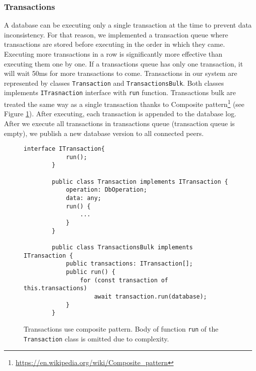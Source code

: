 \subsubsection{Transactions}
A database can be executing only a single transaction at the time to prevent data inconsistency. For that reason, we implemented a transaction queue where transactions are stored before executing in the order in which they came. Executing more transactions in a row is significantly more effective than executing them one by one. If a transactions queue has only one transaction, it will wait 50ms for more transactions to come. Transactions in our system are represented by classes \texttt{Transaction} and \texttt{TransactionsBulk}. Both classes implements \texttt{ITrasnaction} interface with \texttt{run} function. Transactions bulk are treated the same way as a single transaction thanks to Composite pattern\footnote{\url{https://en.wikipedia.org/wiki/Composite_pattern}} (see Figure \ref{transactionsComposite}). After executing, each transaction is appended to the database log. After we execute all transactions in transactions queue (transaction queue is empty), we publish a new database version to all connected peers.

\begin{figure}[h]
    \centering
    \begin{lstlisting}[style=ES6]
        interface ITransaction{
            run();
        }
        
        public class Transaction implements ITransaction {
            operation: DbOperation;
            data: any;
            run() {
                ...
            }
        }
        
        public class TransactionsBulk implements ITransaction {
            public transactions: ITransaction[];
            public run() {
                for (const transaction of this.transactions)
                    await transaction.run(database);
            }
        }
    \end{lstlisting}
    \caption{Transactions use composite pattern. Body of function \texttt{run} of the \texttt{Transaction} class is omitted due to complexity.}
    \label{transactionsComposite}
\end{figure}


